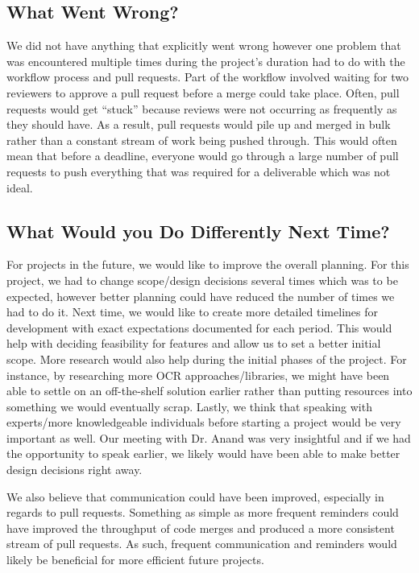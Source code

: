 \documentclass{article}
\begin{document}
\subsection{What Went Wrong?}


We did not have anything that explicitly went wrong however one problem that was encountered multiple times during
the project's duration had to do with the workflow process and pull requests. Part of the workflow
involved waiting for two reviewers to approve a pull request before a merge could take place. Often,
pull requests would get ``stuck'' because reviews were not occurring as frequently
as they should have. As a result, pull requests would pile up and merged in bulk rather than a constant stream
of work being pushed through. This would often mean that before a deadline, everyone would go through
a large number of pull requests to push everything that was required for a deliverable which was not ideal.

\subsection{What Would you Do Differently Next Time?}


For projects in the future, we would like to improve the overall planning. For this project, we had to change scope/design decisions several
times which was to be expected, however better planning could have reduced the number of
times we had to do it. Next time, we would like to create more detailed timelines for development with exact
expectations documented for each period. This would help with deciding feasibility for features and allow us
to set a better initial scope. More research would also help during the initial phases of the project.
For instance, by researching more OCR approaches/libraries, we might have been able to settle on an off-the-shelf solution
earlier rather than putting resources into something we would eventually scrap. Lastly, we think that speaking with experts/more
knowledgeable individuals before starting a project would be very important as well. Our meeting with Dr. Anand was very insightful
and if we had the opportunity to speak earlier, we likely would have been able to make better design decisions right away.

We also believe that communication could have been improved, especially in regards to pull requests.
Something as simple as more frequent reminders could have improved the throughput of code merges and produced a more
consistent stream of pull requests. As such, frequent communication and reminders would likely be beneficial for more efficient future
projects.
\end{document}
